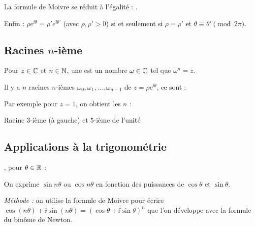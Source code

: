 \documentclass[10pt,class=article,crop=false]{standalone}
\begin{document}
\begin{multicols}{2}
La formule de Moivre se réduit à l'égalité : .

Enfin : $\rho e^{\ii \theta} = \rho' e^{\ii \theta'}$ (avec $\rho, \rho' > 0$)
si et seulement si $\rho = \rho'$ et $\theta \equiv \theta' \pmod{2\pi}$.



\subsection{Racines $n$-ième}

Pour $z \in \mathbb{C}$ et $n \in \mathbb{N}$, une  est un nombre $\omega \in \mathbb{C}$ tel que $\omega^n = z$.


\begin{proposition}
	Il y a $n$ racines $n$-ièmes $\omega_0, \omega_1, \ldots, \omega_{n - 1}$ de $z=\rho e^{\ii  \theta}$, ce sont :
\end{proposition}

Par exemple pour $z = 1$, on obtient les $n$  :


\centerline{Racine $3$-ième (à gauche) et $5$-ième de l'unité}




\subsection{Applications à la trigonométrie}

, pour $\theta \in \mathbb{R}$ :


 On exprime $\sin n \theta$ ou $\cos n \theta$ en
fonction des puissances de $\cos \theta$ et $\sin \theta$.

\emph{Méthode :} on utilise la formule de Moivre pour écrire $\cos \left( n
\theta \right) + \ii  \sin \left( n \theta \right) = \left( \cos \theta + \ii  \sin
\theta \right)^n$ que l'on développe avec la formule du bin\^ome de Newton.


\end{multicols}
\end{document}

